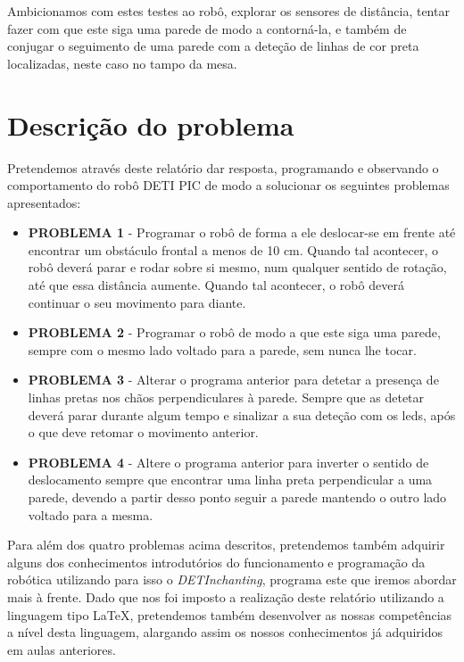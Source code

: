 \documentclass[a4paper, 12pt, onecolumn, oneside]{report}
\begin{document}
Ambicionamos com estes testes ao robô, explorar os sensores de distância, tentar fazer com que este siga uma parede de modo a contorná-la, e também de conjugar o seguimento de uma parede com a deteção de linhas de cor preta localizadas, neste caso no tampo da mesa. 



\newpage
\section{Descrição do problema}

Pretendemos através deste relatório dar resposta, programando e observando o comportamento do robô DETI PIC de modo a solucionar os seguintes problemas apresentados: 

\begin{itemize}
  \item \textbf{PROBLEMA 1} - Programar o robô de forma a ele deslocar-se em frente até encontrar um obstáculo frontal a menos de 10 cm. Quando tal acontecer, o robô deverá parar e rodar sobre si mesmo, num qualquer sentido de rotação, até que essa distância aumente. Quando tal acontecer, o robô deverá continuar o seu movimento para diante. 
\end{itemize}

\begin{itemize}
  \item \textbf{PROBLEMA 2} - Programar o robô de modo a que este siga uma parede, sempre com o mesmo lado voltado para a parede, sem nunca lhe tocar.
\end{itemize}

\begin{itemize}
  \item \textbf{PROBLEMA 3} - Alterar o programa anterior para detetar a presença de linhas pretas nos chãos perpendiculares à parede. Sempre que as detetar deverá parar durante algum tempo e sinalizar a sua deteção com os leds, após o que deve retomar o movimento anterior. 
\end{itemize}

\begin{itemize}
  \item \textbf{PROBLEMA 4} - Altere o programa anterior para inverter o sentido de deslocamento sempre que encontrar uma linha preta perpendicular a uma parede, devendo a partir desso ponto seguir a parede mantendo o outro lado voltado para a mesma. 
\end{itemize}


Para além dos quatro problemas acima descritos, pretendemos também adquirir alguns dos conhecimentos introdutórios do funcionamento e programação da robótica utilizando para isso o \emph{DETInchanting}, programa este que iremos abordar mais à frente. Dado que nos foi imposto a realização deste relatório utilizando a linguagem tipo \LaTeX, pretendemos também desenvolver as nossas competências a nível desta linguagem, alargando assim os nossos conhecimentos já adquiridos em aulas anteriores.   
\end{document}
